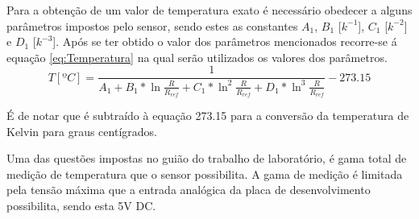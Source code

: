 Para a obtenção de um valor de temperatura exato é necessário obedecer a alguns parâmetros impostos pelo sensor, sendo estes as constantes \(A_1\), \(B_1\) [\(k^{-1}\)], \(C_1\) [\(k^{-2}\)] e \(D_1\) [\(k^{-3}\)]. Após se ter obtido o valor dos parâmetros mencionados recorre-se á equação \ref{eq:Temperatura} na qual serão utilizados os valores dos parâmetros.
\begin{equation}
T [ºC] = \frac{1}{A_1 + B_1*\ln\frac{R}{R_{ref}} + C_1*\ln^2\frac{R}{R_{ref}} + D_1*\ln^3\frac{R}{R_{ref}}}- 273.15
\label{eq:Temperatura}
\end{equation}

É de notar que é subtraído à equação 273.15 para a conversão da temperatura de Kelvin para graus centígrados.

Uma das questões impostas no guião do trabalho de laboratório, é gama total de medição de temperatura que o sensor possibilita. A gama de medição é limitada pela tensão máxima que a entrada analógica da placa de desenvolvimento possibilita, sendo esta 5V DC. 

\newpage
